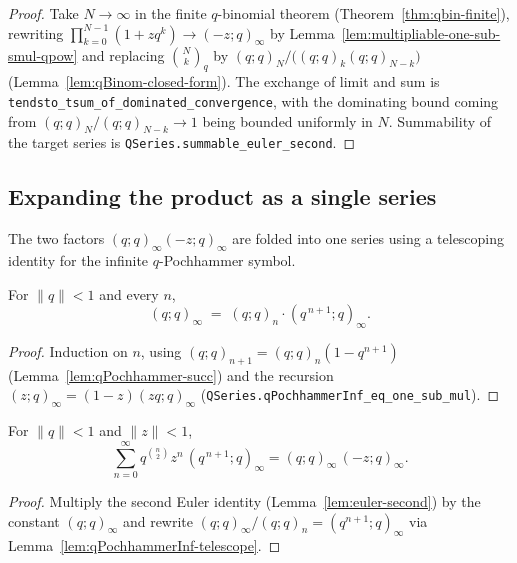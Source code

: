 \begin{proof}\leanok
Take $N \to \infty$ in the finite $q$-binomial theorem
(Theorem~\ref{thm:qbin-finite}), rewriting
$\prod_{k=0}^{N-1}(1 + z q^k) \to (-z;q)_\infty$ by
Lemma~\ref{lem:multipliable-one-sub-smul-qpow} and replacing
$\binom{N}{k}_q$ by $(q;q)_N / \bigl((q;q)_k (q;q)_{N-k}\bigr)$
(Lemma~\ref{lem:qBinom-closed-form}). The exchange of limit and sum is
\texttt{tendsto\_tsum\_of\_dominated\_convergence}, with the dominating bound
coming from $(q;q)_N / (q;q)_{N-k} \to 1$ being bounded uniformly in $N$.
Summability of the target series is
\texttt{QSeries.summable\_euler\_second}.
\end{proof}

\subsection{Expanding the product as a single series}

The two factors $(q;q)_\infty(-z;q)_\infty$ are folded into one series using a
telescoping identity for the infinite $q$-Pochhammer symbol.

\begin{lemma}[Telescoping]\label{lem:qPochhammerInf-telescope}\leanok{}
For $\|q\| < 1$ and every $n$,
\[
  (q;q)_\infty \;=\; (q;q)_n \cdot (q^{\,n+1};q)_\infty.
\]
\end{lemma}

\begin{proof}\leanok
Induction on $n$, using $(q;q)_{n+1} = (q;q)_n(1 - q^{n+1})$
(Lemma~\ref{lem:qPochhammer-succ}) and the recursion
$(z;q)_\infty = (1-z)(zq;q)_\infty$
(\texttt{QSeries.qPochhammerInf\_eq\_one\_sub\_mul}).
\end{proof}

\begin{lemma}\label{lem:qPochhammerInf-prod-hassum}\leanok{}
For $\|q\| < 1$ and $\|z\| < 1$,
\[
  \sum_{n=0}^{\infty} q^{\binom{n}{2}} z^n\,(q^{\,n+1};q)_\infty
    = (q;q)_\infty\,(-z;q)_\infty.
\]
\end{lemma}

\begin{proof}\leanok
Multiply the second Euler identity (Lemma~\ref{lem:euler-second}) by the
constant $(q;q)_\infty$ and rewrite $(q;q)_\infty/(q;q)_n = (q^{n+1};q)_\infty$
via Lemma~\ref{lem:qPochhammerInf-telescope}.
\end{proof}


